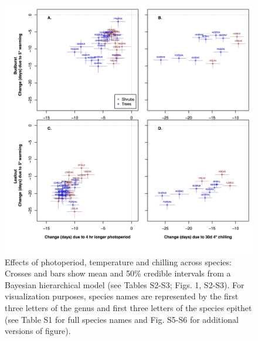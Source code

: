 \documentclass[11pt]{article}
\begin{document}
\newpage
\begin{figure}[h!]
\centering
\noindent \includegraphics[width=1\textwidth]{images/Fig2_4panel.png}
\caption{Effects of photoperiod, temperature and chilling across species: Crosses and bars show mean and 50\% credible intervals from a Bayesian hierarchical model (see Tables S2-S3; Figs. 1, S2-S3). For visualization purposes, species names are represented by the first three letters of the genus and first three letters of the species epithet (see Table S1 for full species names and Fig. S5-S6 for additional versions of figure).}
\label{fig:sppeff}
\end{figure}
\end{document}
